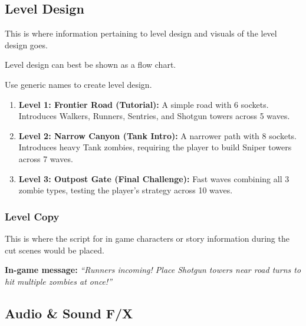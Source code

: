 \subsection{Level Design}

\begin{guidance}
This is where information pertaining to level design and visuals of the level design goes.

Level design can best be shown as a flow chart.

Use generic names to create level design.
\end{guidance}
\begin{enumerate}
  \item \textbf{Level 1: Frontier Road (Tutorial):} A simple road with 6 sockets. Introduces Walkers, Runners, Sentries, and Shotgun towers across 5 waves.
  \item \textbf{Level 2: Narrow Canyon (Tank Intro):} A narrower path with 8 sockets. Introduces heavy Tank zombies, requiring the player to build Sniper towers across 7 waves.
  \item \textbf{Level 3: Outpost Gate (Final Challenge):} Fast waves combining all 3 zombie types, testing the player's strategy across 10 waves.
\end{enumerate}

\subsubsection{Level Copy}

\begin{guidance}
This is where the script for in game characters or story information during the cut scenes would be placed.
\end{guidance}
\textbf{In-game message:} \textit{``Runners incoming! Place Shotgun towers near road turns to hit multiple zombies at once!''}

\subsection{Audio \& Sound F/X}

